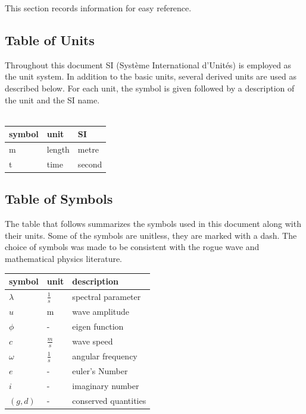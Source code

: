 \documentclass[12pt]{article}
\begin{document}
This section records information for easy reference.

\subsection{Table of Units}

Throughout this document SI (Syst\`{e}me International d'Unit\'{e}s) is employed
as the unit system.  In addition to the basic units, several derived units are
used as described below.  For each unit, the symbol is given followed by a
description of the unit and the SI name. \\

~\newline

\renewcommand{\arraystretch}{1.2}
  \noindent \begin{tabular}{l l l} 
    \toprule		
    \textbf{symbol} & \textbf{unit} & \textbf{SI}\\
    \midrule 
    \si{\metre} & length & metre\\
    t & time & second\\
    \bottomrule
  \end{tabular}


\subsection{Table of Symbols}

The table that follows summarizes the symbols used in this document along with
their units. Some of the symbols are unitless, 
they are marked with a dash. The choice of symbols was made to be consistent 
with the rogue 
wave and mathematical physics literature.  

\renewcommand{\arraystretch}{1.2}
\noindent \begin{longtable*}{l l p{12cm}} \toprule
\textbf{symbol} & \textbf{unit} & \textbf{description}\\
\midrule 
$\lambda$ & $\frac{1}{s}$ & spectral parameter
\\
$u$ & m & wave amplitude 
\\  
$\phi$ & - & eigen function
\\ 
$c$ & $\frac{m}{s}$ & wave speed 
\\
$\omega$ & $\frac{1}{s}$ & angular frequency 
\\ 
$e$ & - & euler's Number \\ 
$i$ & - & imaginary number\\ 
$(g,d)$ & - & conserved quantities\\
  
\bottomrule
\end{longtable*}
\end{document}

